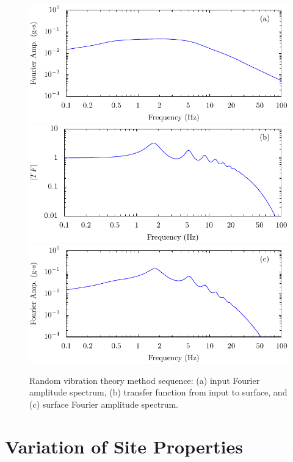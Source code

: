 \documentclass[11pt]{report}
\begin{document}
\begin{figure}[p]
  \begin{center}
	\includegraphics[width=0.95\linewidth]{figures/siteResponse/rvt-rock-fas.pdf}
	\includegraphics[width=0.95\linewidth]{figures/siteResponse/rvt-rock-surface-tf.pdf}
	\includegraphics[width=0.95\linewidth]{figures/siteResponse/rvt-surface-fas.pdf}
  \end{center}
  \caption[RVT method sequence]{Random vibration theory method sequence: (a) input
  Fourier amplitude spectrum, (b) transfer function from input to surface, and (c) surface Fourier
  amplitude spectrum.}
  \label{fig:siteResponse:rvtSequence}
\end{figure}

\chapter{Variation of Site Properties}\label{ch:var}
\end{document}
